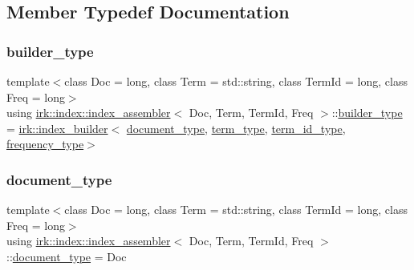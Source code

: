 \subsection{Member Typedef Documentation}
\mbox{\label{classirk_1_1index_1_1index__assembler_a76cb9e6d85a87c9f7d96148e1f28f56e}} 
\subsubsection{\texorpdfstring{builder\+\_\+type}{builder\_type}}
{\footnotesize\ttfamily template$<$class Doc  = long, class Term  = std\+::string, class Term\+Id  = long, class Freq  = long$>$ \\
using \mbox{\hyperlink{classirk_1_1index_1_1index__assembler}{irk\+::index\+::index\+\_\+assembler}}$<$ Doc, Term, Term\+Id, Freq $>$\+::\mbox{\hyperlink{classirk_1_1index_1_1index__assembler_a76cb9e6d85a87c9f7d96148e1f28f56e}{builder\+\_\+type}} =  \mbox{\hyperlink{classirk_1_1index__builder}{irk\+::index\+\_\+builder}}$<$ \mbox{\hyperlink{classirk_1_1index_1_1index__assembler_a42424117b672fc1383b3be13f3338bc4}{document\+\_\+type}}, \mbox{\hyperlink{classirk_1_1index_1_1index__assembler_a1dec315f145c0e887e0035c3b7f23235}{term\+\_\+type}}, \mbox{\hyperlink{classirk_1_1index_1_1index__assembler_ad632345d29f93e9f10fbc7e91db41f77}{term\+\_\+id\+\_\+type}}, \mbox{\hyperlink{classirk_1_1index_1_1index__assembler_a8da91d64fb4a68136f7978944e7f3373}{frequency\+\_\+type}}$>$}

\mbox{\label{classirk_1_1index_1_1index__assembler_a42424117b672fc1383b3be13f3338bc4}} 
\subsubsection{\texorpdfstring{document\+\_\+type}{document\_type}}
{\footnotesize\ttfamily template$<$class Doc  = long, class Term  = std\+::string, class Term\+Id  = long, class Freq  = long$>$ \\
using \mbox{\hyperlink{classirk_1_1index_1_1index__assembler}{irk\+::index\+::index\+\_\+assembler}}$<$ Doc, Term, Term\+Id, Freq $>$\+::\mbox{\hyperlink{classirk_1_1index_1_1index__assembler_a42424117b672fc1383b3be13f3338bc4}{document\+\_\+type}} =  Doc}

